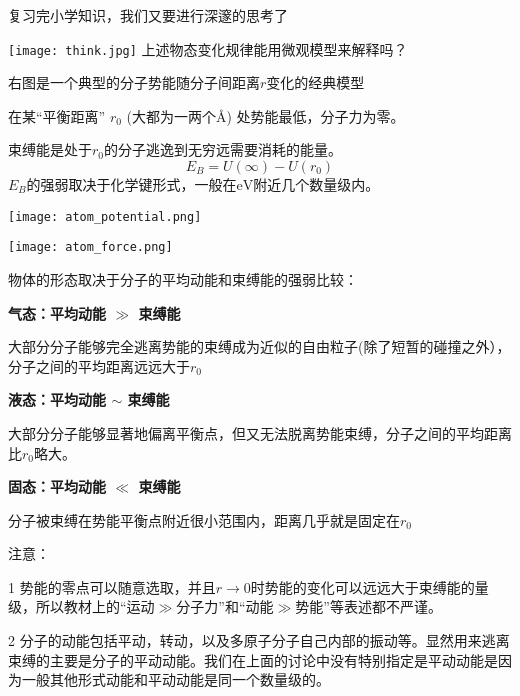 \documentclass[CJK]{beamer}
\begin{document}
\begin{frame}
\bch

复习完小学知识，我们又要进行深邃的思考了

\bcenter
\texttt{[image: think.jpg]}
\ecenter
上述物态变化规律能用微观模型来解释吗？
\ech
\end{frame}

\begin{frame}
\bch

{\small
右图是一个典型的分子势能随分子间距离$r$变化的经典模型

在某“平衡距离” $r_0$ (大都为一两个\AA) 处势能最低，分子力为零。

束缚能是处于$r_0$的分子逃逸到无穷远需要消耗的能量。
$$E_B = U(\infty) - U(r_0) $$
$E_B$的强弱取决于化学键形式，一般在$\mathrm{eV}$附近几个数量级内。}
\emini
\hspace{0.2in}

\texttt{[image: atom\_potential.png]}

\vspace{0.05in}

\texttt{[image: atom\_force.png]}
\emini
\ech
\end{frame}

\begin{frame}
\bch
物体的形态取决于分子的平均动能和束缚能的强弱比较：
\bitem
\item{{\bf 气态：平均动能 $\gg$ 束缚能}

{\scriptsize 大部分分子能够完全逃离势能的束缚成为近似的自由粒子(除了短暂的碰撞之外），分子之间的平均距离远远大于$r_0$}
}
\item{{\bf 液态：平均动能 $\sim$ 束缚能}

{\scriptsize 大部分分子能够显著地偏离平衡点，但又无法脱离势能束缚，分子之间的平均距离比$r_0$略大。}
}
\item{{\bf 固态：平均动能 $\ll$ 束缚能}

{\scriptsize 分子被束缚在势能平衡点附近很小范围内，距离几乎就是固定在$r_0$}
}
\eitem

{\scriptsize 注意：
\bitem
\item[1]{ 势能的零点可以随意选取，并且$r\rightarrow 0$时势能的变化可以远远大于束缚能的量级，所以教材上的“运动$\gg$分子力”和“动能$\gg$势能”等表述都不严谨。}
\item[2]{分子的动能包括平动，转动，以及多原子分子自己内部的振动等。显然用来逃离束缚的主要是分子的平动动能。我们在上面的讨论中没有特别指定是平动动能是因为一般其他形式动能和平动动能是同一个数量级的。}
\eitem
}
\ech
\end{frame}
\end{document}
